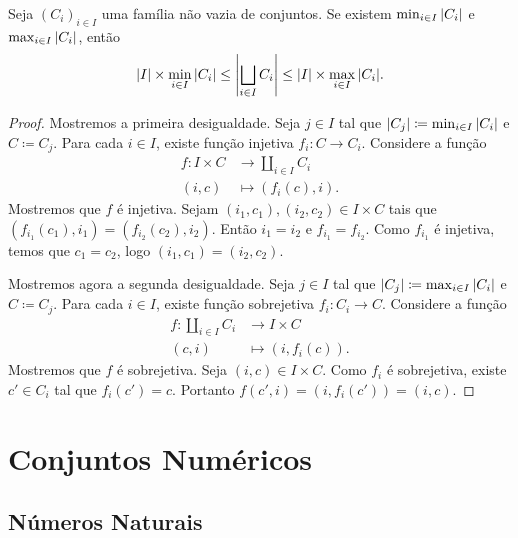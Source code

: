 \begin{teo}
Seja $(C_i)_{i \in I}$ uma família não vazia de conjuntos. Se existem $\min_{i \in I}{\left\vert{C_i}\right\vert}$ e $\max_{i \in I}{\left\vert{C_i}\right\vert}$, então
\begin{equation*}
\left\vert{I}\right\vert \times \min_{i \in I}{\left\vert{C_i}\right\vert} \leq \left\vert{\bigsqcup_{i \in I} C_i}\right\vert \leq \left\vert{I}\right\vert \times \max_{i \in I}{\left\vert{C_i}\right\vert}.
\end{equation*}
\end{teo}
\begin{proof}
Mostremos a primeira desigualdade. Seja $j \in I$ tal que $\card{C_j} \coloneqq \min_{i \in I}{\card{C_i}}$ e $C \coloneqq C_j$. Para cada $i \in I$, existe função injetiva $f_i: C \to C_i$. Considere a função
	\begin{align*}
	f: I \times C &\to \coprod_{i \in I} C_i \\
			(i,c) &\mapsto (f_i(c),i).
	\end{align*}
Mostremos que $f$ é injetiva. Sejam $(i_1,c_1),(i_2,c_2) \in I \times C$ tais que $(f_{i_1}(c_1),i_1)=(f_{i_2}(c_2),i_2)$. Então $i_1=i_2$ e $f_{i_1}=f_{i_2}$. Como $f_{i_1}$ é injetiva, temos que $c_1=c_2$, logo $(i_1,c_1)=(i_2,c_2)$.

Mostremos agora a segunda desigualdade. Seja $j \in I$ tal que $\card{C_j} \coloneqq \max_{i \in I}{\card{C_i}}$ e $C \coloneqq C_j$. Para cada $i \in I$, existe função sobrejetiva $f_i: C_i \to C$. Considere a função
	\begin{align*}
	f: \coprod_{i \in I} C_i &\to I \times C \\
			(c,i) &\mapsto (i,f_i(c)).
	\end{align*}
Mostremos que $f$ é sobrejetiva. Seja $(i,c) \in I \times C$. Como $f_i$ é sobrejetiva, existe $c' \in C_i$ tal que $f_i(c')=c$. Portanto $f(c',i)=(i,f_i(c'))=(i,c)$.	
\end{proof}








\chapter{Conjuntos Numéricos}


\section{Números Naturais}

